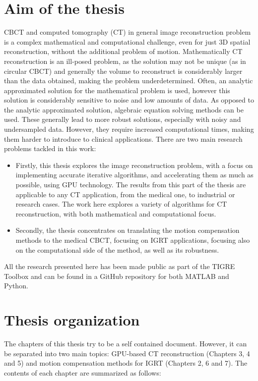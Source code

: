 \section{Aim of the thesis}

CBCT and computed tomography (CT) in general image reconstruction problem is a complex mathematical and computational challenge, even for just 3D spatial reconstruction, without the additional problem of motion. Mathematically CT reconstruction is an ill-posed problem, as the solution may not be unique (as in circular CBCT) and generally the volume to reconstruct is considerably larger than the  data obtained, making the problem underdetermined. Often, an analytic approximated solution for the  mathematical problem is used, however this solution is considerably sensitive to noise and low amounts of data. As opposed to the analytic approximated solution, algebraic equation solving methods can be used. These generally lead to more robust solutions, especially with noisy and undersampled data. However, they require increased computational times, making them harder to introduce to clinical applications. There are two main research problems tackled in this work:

\begin{itemize}
\item Firstly, this thesis explores the image reconstruction problem, with a focus on implementing accurate iterative algorithms, and accelerating them as much as possible, using GPU technology. The results from this part of the thesis are applicable to any CT application, from the medical one, to industrial or research cases. The work here explores a variety of algorithms for CT reconstruction, with both mathematical and computational focus.
\item Secondly, the thesis concentrates on translating the motion compensation methods to the medical CBCT, focusing on IGRT applications, focusing also on the computational side of the method, as well as its robustness.
\end{itemize}

All the research presented here has been made public as part of the TIGRE Toolbox\cite{TIGRE} and can be found in a GitHub repository\cite{TIGREweb} for both MATLAB and Python. 

\section{Thesis organization}

The chapters of this thesis try to be a self contained document. However, it can be separated into two main topics: GPU-based CT reconstruction (Chapters 3, 4 and 5) and motion compensation methods for IGRT (Chapters 2, 6 and 7). The contents of each chapter are summarized as follows:

